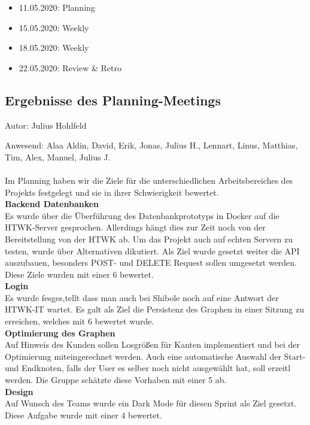 \begin{itemize}
\item 11.05.2020: Planning
\item 15.05.2020: Weekly
\item 18.05.2020: Weekly
\item 22.05.2020: Review \& Retro
\end{itemize}

\subsection{Ergebnisse des Planning-Meetings}
{\small Autor: Julius Hohlfeld}

Anwesend: Alaa Aldin, David, Erik, Jonas, Julius H., Lennart, Linus, Matthias, Tim, Alex, Manuel, Julius J.\\
\\
Im Planning haben wir die Ziele für die unterschiedlichen Arbeitsbereiches des Projekts festgelegt und sie in ihrer Schwierigkeit bewertet.\\


\textbf{Backend Datenbanken}\\
Es wurde über die Überführung des Datenbankprototyps in Docker auf die HTWK-Server gesprochen. Allerdings hängt dies zur Zeit noch von der Bereitstellung von der HTWK ab.
Um das Projekt auch auf echten Servern zu testen, wurde über Alternativen dikutiert. Als Ziel wurde gesetzt weiter die API auszubauen, besonders POST- und DELETE Request sollen
umgesetzt werden. Diese Ziele wurden mit einer 6 bewertet.\\

\textbf{Login}\\
Es wurde fesges,tellt dass man auch bei Shibole noch auf eine Antwort der HTWK-IT wartet.
Es galt als Ziel die Persistenz des Graphen in einer Sitzung zu erreichen, welches mit 6 bewertet wurde.\\

\textbf{Optimierung des Graphen}\\
Auf Hinweis des Kunden sollen Losgrößen für Kanten implementiert und bei der Optimierung miteingerechnet werden. Auch eine automatische Auswahl der Start- und Endknoten, falls der User
es selber noch nicht ausgewählt hat, soll erzeitl werden. Die Gruppe schätzte diese Vorhaben mit einer 5 ab.\\

\textbf{Design}\\
Auf Wunsch des Teams wurde ein Dark Mode für diesen Sprint als Ziel gesetzt. Diese Aufgabe wurde mit einer 4 bewertet.\\

